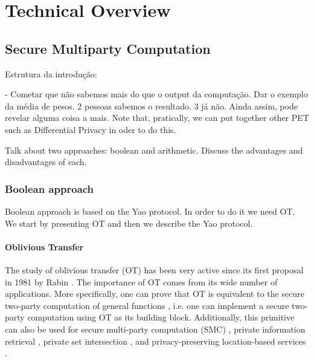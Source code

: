 


%

\chapter{Technical Overview}



\section{Secure Multiparty Computation}


Estrutura da introdução:

- Cometar que não sabemos mais do que o output da computação. Dar o exemplo da média de pesos. 2 pessoas sabemos o resultado. 3 já não. Ainda assim, pode revelar alguma coisa a mais. Note that, pratically, we can put together other PET such as Differential Privacy in oder to do this.




Talk about two approaches: boolean and arithmetic. Discuss the advantages and disadvantages of each.

\subsection{Boolean approach}

Boolean approach is based on the Yao protocol. In order to do it we need OT. We start by presenting OT and then we describe the Yao protocol.


\subsubsection{Oblivious Transfer}

The study of oblivious transfer (OT) has been very active since its first proposal in 1981 by Rabin \cite{Rabin81}. The importance of OT comes from its wide number of applications. More specifically, one can prove that OT is equivalent to the secure two-party computation of general functions \cite{Y86, K88}, i.e. one can implement a secure two-party computation using OT as its building block. Additionally, this primitive can also be used for secure multi-party computation (SMC) \cite{KOS16}, private information retrieval \cite{Che04}, private set intersection \cite{MEP17}, and privacy-preserving location-based services \cite{BHM+19}. 









